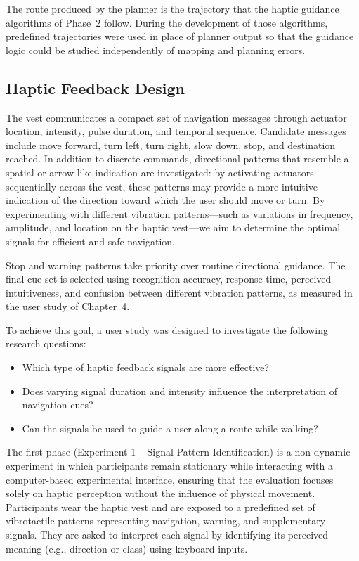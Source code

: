 \documentclass[12pt]{report}
\begin{document}
The route produced by the planner is the trajectory that the haptic guidance algorithms of Phase~2 follow. During the development of those algorithms, predefined trajectories were used in place of planner output so that the guidance logic could be studied independently of mapping and planning errors.

\subsection*{Haptic Feedback Design}

The vest communicates a compact set of navigation messages through actuator location, intensity, pulse duration, and temporal sequence. Candidate messages include move forward, turn left, turn right, slow down, stop, and destination reached. In addition to discrete commands, directional patterns that resemble a spatial or arrow-like indication are investigated: by activating actuators sequentially across the vest, these patterns may provide a more intuitive indication of the direction toward which the user should move or turn. By experimenting with different vibration patterns---such as variations in frequency, amplitude, and location on the haptic vest---we aim to determine the optimal signals for efficient and safe navigation.

Stop and warning patterns take priority over routine directional guidance. The final cue set is selected using recognition accuracy, response time, perceived intuitiveness, and confusion between different vibration patterns, as measured in the user study of Chapter~4.

To achieve this goal, a user study was designed to investigate the following research questions:

\begin{itemize}
    \item Which type of haptic feedback signals are more effective?
    \item Does varying signal duration and intensity influence the interpretation of navigation cues?
    \item Can the signals be used to guide a user along a route while walking?
\end{itemize}

The first phase (Experiment 1 -- Signal Pattern Identification) is a non-dynamic experiment in which participants remain stationary while interacting with a computer-based experimental interface, ensuring that the evaluation focuses solely on haptic perception without the influence of physical movement. Participants wear the haptic vest and are exposed to a predefined set of vibrotactile patterns representing navigation, warning, and supplementary signals. They are asked to interpret each signal by identifying its perceived meaning (e.g., direction or class) using keyboard inputs.
\end{document}
